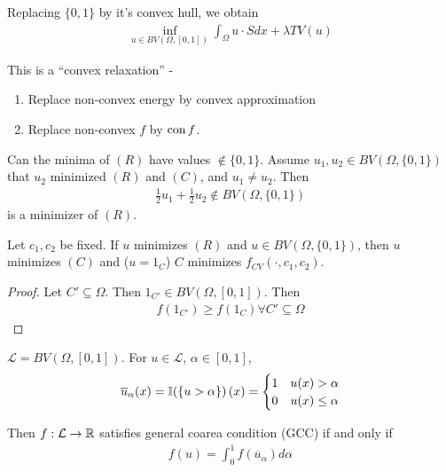Replacing $\{ 0, 1 \}$ by it's convex hull, we obtain
\begin{align}
  \label{eq:114}
  \tag{$(R)$}
  \inf_{u \in BV(\Omega, [0, 1])} \int_{\Omega}  u \cdot S dx +
  \lambda TV(u)
\end{align}

This is a ``convex relaxation'' -
\begin{enumerate}
\item Replace non-convex energy by convex approximation
\item Replace non-convex $f$ by $\operatorname*{con} f$.
\end{enumerate}

Can the minima of $(R)$ have values $\notin \{ 0, 1 \}$. Assume
$u_{1}, u_{2} \in BV(\Omega, \{ 0, 1 \})$ that $u_{2}$ minimized $(R)$
and $(C)$, and $u_{1} \neq u_{2}$. Then
\begin{align}
  \label{eq:115}
  \frac{1}{2} u_{1} + \frac{1}{2} u_{2} \notin BV(\Omega, \{ 0, 1 \})
\end{align} is a minimizer of $(R)$.

\begin{proposition}
  Let $c_{1}, c_{2}$ be fixed. If $u$ minimizes $(R)$ and $u \in
  BV(\Omega, \{ 0, 1 \})$, then $u$ minimizes $(C)$ and ($u = 1_{C}$)
  $C$ minimizes $f_{CV}(\cdot, c_{1}, c_{2})$.
\end{proposition}

\begin{proof}
  Let $C' \subseteq \Omega$.  Then $1_{C'} \in BV(\Omega, [0, 1])$.
  Then 
  \begin{align}
    \label{eq:116}
    f(1_{C'}) \geq f(1_{C}) \forall C' \subseteq \Omega
  \end{align}
\end{proof}

\begin{defn}
  \label{defn:relaxation:3}
  $\mathcal{L} = BV(\Omega, [0, 1])$.  For $u \in \mathcal{L}$,
  $\alpha \in [0, 1]$,
  \begin{align}
    \label{eq:117}
    \overline u_{\alpha}(x) = \I{\{ u > \alpha \}}(x) =
    \begin{cases}
      1 & u(x) > \alpha \\
      0 & u(x) \leq \alpha
    \end{cases}
  \end{align}

  Then $f: \mathcal{L} \rightarrow \mathbb{R}$ satisfies general coarea
  condition (GCC) if and only if
  \begin{align}
    \label{eq:118}
    f(u) = \int_{0}^{1} f(\overline u_{\alpha}) d\alpha
  \end{align} 
\end{defn}


